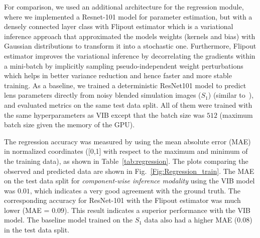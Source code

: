 \documentclass[12pt, twocolumn, apj]{openjournal}
\begin{document}
For comparison, we used an additional architecture for the regression module, where we implemented a Resnet-101 model for parameter estimation, but with a densely connected layer class with Flipout estimator \citep{wen2018flipout} which is a variational inference approach that approximated the models weights (kernels and bias) with Gaussian distributions to transform it into a stochastic one. Furthermore, Flipout estimator improves the variational inference by decorrelating the gradients within a mini-batch by implicitly sampling pseudo-independent weight perturbations which helps in better variance reduction and hence faster and more stable training.
As a baseline, we trained a deterministic ResNet101 model to predict lens parameters directly from noisy blended simulation images ($S_1$) (similar to~\cite{Pearson2019}), and evaluated metrics on the same test data split. All of them were trained with the same hyperparameters as VIB except that the batch size was $512$ (maximum batch size given the memory of the GPU).

The regression accuracy was measured by using the mean absolute error (MAE) in normalized coordinates ([0,1] with respect to the maximum and minimum of the training data), as shown in Table~\ref{tab:regression}. 
The plots comparing the observed and predicted data are shown in Fig.~\ref{Fig:Regression_train}. 
The MAE on the test data split for {\em component-wise inference modality} using the VIB model was $0.01$, which indicates a very good agreement with the ground truth. The corresponding accuracy for ResNet-101 with the Flipout estimator was much lower (MAE = $0.09$). This result indicates a superior performance with the VIB model. The baseline model trained on the $S_1$ data also had a higher MAE ($0.08$) in the test data split.
\end{document}

